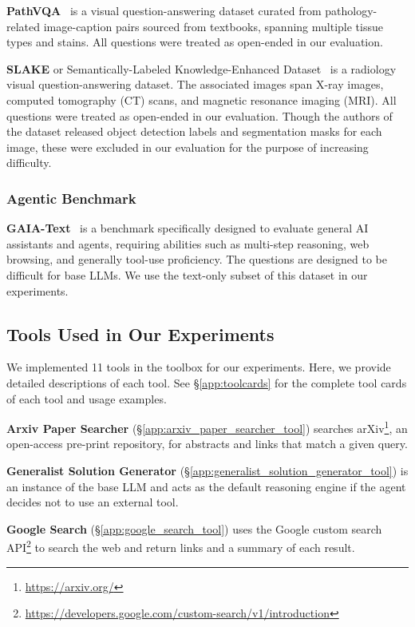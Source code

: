 \textbf{PathVQA}~\cite{he2020pathvqa} is a visual question-answering dataset curated from pathology-related image-caption pairs sourced from textbooks, spanning multiple tissue types and stains. All questions were treated as open-ended in our evaluation. 

\textbf{SLAKE} or Semantically-Labeled Knowledge-Enhanced Dataset~\cite{liu2021slake} is a radiology visual question-answering dataset. The associated images span X-ray images, computed tomography (CT) scans, and magnetic resonance imaging (MRI). All questions were treated as open-ended in our evaluation. Though the authors of the dataset released object detection labels and segmentation masks for each image, these were excluded in our evaluation for the purpose of increasing difficulty.

\subsubsection{Agentic Benchmark}

\textbf{GAIA-Text}~\cite{mialon2023gaia} is a benchmark specifically designed to evaluate general AI assistants and agents, requiring abilities such as multi-step reasoning, web browsing, and generally tool-use proficiency. The questions are designed to be difficult for base LLMs. We use the text-only subset of this dataset in our experiments.

\subsection{Tools Used in Our Experiments}
\label{app:tool_descriptions}

We implemented 11 tools in the toolbox for our experiments. Here, we provide detailed descriptions of each tool. See \S\ref{app:toolcards} for the complete tool cards of each tool and usage examples. 

\textbf{Arxiv Paper Searcher} (\S\ref{app:arxiv_paper_searcher_tool}) searches arXiv\footnote{\url{https://arxiv.org/}}, an open-access pre-print repository, for abstracts and links that match a given query.

\textbf{Generalist Solution Generator} (\S\ref{app:generalist_solution_generator_tool}) is an instance of the \model base LLM and acts as the default reasoning engine if the agent decides not to use an external tool.

\textbf{Google Search} (\S\ref{app:google_search_tool}) uses the Google custom search API\footnote{\url{https://developers.google.com/custom-search/v1/introduction}} to search the web and return links and a summary of each result. 

